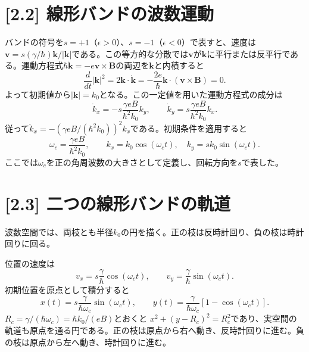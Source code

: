 \documentclass[11pt,a4paper]{article}
\begin{document}
\section*{[2.2] 線形バンドの波数運動}
バンドの符号を$s=+1$（$\epsilon>0$）、$s=-1$（$\epsilon<0$）で表すと、速度は$\boldsymbol v=s(\gamma/\hbar)\boldsymbol k/|\boldsymbol k|$である。この等方的な分散では$\boldsymbol v$が$\boldsymbol k$に平行または反平行である。運動方程式$\hbar\dot{\boldsymbol k}=-e\boldsymbol v\times\boldsymbol B$の両辺を$\boldsymbol k$と内積すると
\begin{equation}
 \frac{d}{dt}|\boldsymbol k|^2=2\boldsymbol k\cdot\dot{\boldsymbol k}
 =-\frac{2e}{\hbar}\boldsymbol k\cdot(\boldsymbol v\times\boldsymbol B)=0.
\end{equation}
よって初期値から$|\boldsymbol k|=k_0$となる。この一定値を用いた運動方程式の成分は
\begin{equation}
 \dot k_x=-s\frac{\gamma eB}{\hbar^2k_0}k_y,\qquad
 \dot k_y=s\frac{\gamma eB}{\hbar^2k_0}k_x.
\end{equation}
従って$\ddot k_x=-(\gamma eB/(\hbar^2k_0))^2k_x$である。初期条件を適用すると
\begin{equation}
  \boxed{\omega_c=\frac{\gamma eB}{\hbar^2k_0}},\qquad
  \boxed{k_x=k_0\cos(\omega_ct),\quad
         k_y=s k_0\sin(\omega_ct).}
\end{equation}
ここでは$\omega_c$を正の角周波数の大きさとして定義し、回転方向を$s$で表した。

\section*{[2.3] 二つの線形バンドの軌道}
波数空間では、両枝とも半径$k_0$の円を描く。正の枝は反時計回り、負の枝は時計回りに回る。

位置の速度は
\begin{equation}
  v_x=s\frac{\gamma}{\hbar}\cos(\omega_ct),\qquad
  v_y=\frac{\gamma}{\hbar}\sin(\omega_ct).
\end{equation}
初期位置を原点として積分すると
\begin{equation}
  \boxed{x(t)=s\frac{\gamma}{\hbar\omega_c}\sin(\omega_ct),\qquad
  y(t)=\frac{\gamma}{\hbar\omega_c}[1-\cos(\omega_ct)].}
\end{equation}
$R_c=\gamma/(\hbar\omega_c)=\hbar k_0/(eB)$とおくと
$x^2+(y-R_c)^2=R_c^2$であり、実空間の軌道も原点を通る円である。正の枝は原点から右へ動き、反時計回りに進む。負の枝は原点から左へ動き、時計回りに進む。
\end{document}
